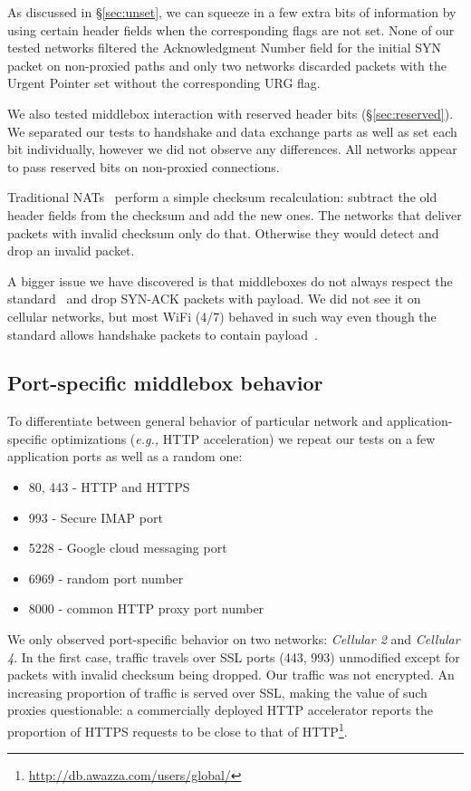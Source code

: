 \documentclass{sig-alternate-10pt}
\providecommand{\eg}{\emph{e.g.,} }
\begin{document}
As discussed in \S\ref{sec:unset}, we can squeeze in a few extra bits of information by using certain header fields when the corresponding flags are not set. None of our tested networks filtered the Acknowledgment Number field for the initial SYN packet on non-proxied paths and only two networks discarded packets with the Urgent Pointer set without the corresponding URG flag.

We also tested middlebox interaction with reserved header bits (\S\ref{sec:reserved}). We separated our tests to handshake and data exchange parts as well as set each bit individually, however we did not observe any differences. All networks appear to pass reserved bits on non-proxied connections.

Traditional NATs~\cite{Egevang:tu} perform a simple checksum recalculation: subtract the old header fields from the checksum and add the new ones. The networks that deliver packets with invalid checksum only do that. Otherwise they would detect and drop an invalid packet.

A bigger issue we have discovered is that middleboxes do not always respect the standard~\cite{Postel:3EDyoxP_} and drop SYN-ACK packets with payload. We did not see it on cellular networks, but most WiFi (4/7) behaved in such way even though the standard allows handshake packets to contain payload~\cite{Postel:3EDyoxP_,Chu:2011tn}.

\subsection{Port-specific middlebox behavior}
\label{sec:portspec}

To differentiate between general behavior of particular network and application-specific optimizations (\eg HTTP acceleration) we repeat our tests on a few application ports as well as a random one:
\begin{itemize}
    \item 80, 443 - HTTP and HTTPS
    \item 993 - Secure IMAP port
    \item 5228 - Google cloud messaging port
    \item 6969 - random port number
    \item 8000 - common HTTP proxy port number
\end{itemize}

We only observed port-specific behavior on two networks: \emph{Cellular 2} and \emph{Cellular 4}. In the first case, traffic travels over SSL ports (443, 993) unmodified except for packets with invalid checksum being dropped. Our traffic was not encrypted. An increasing proportion of traffic is served over SSL, making the value of such proxies questionable: a commercially deployed HTTP accelerator reports the proportion of HTTPS requests to be close to that of HTTP\footnote{\url{http://db.awazza.com/users/global/}}.
\end{document}
